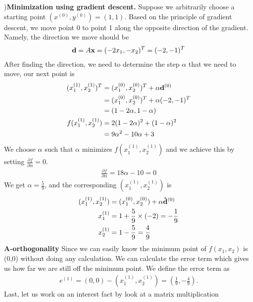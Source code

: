 \documentclass[a4paper]{article}
\begin{document}
){\bf Minimization using gradient descent.} Suppose we arbitrarily choose a starting point $(x^{(0)}, y^{(0)}) = (1, 1)$. Based on the principle of gradient descent, we move point 0 to point 1 along the opposite direction of the gradient. Namely, the direction we move should be
\begin{align*}
	{\bf d} =  A{\bf x} = (-2x_1, -x_2)^T = (-2, -1)^T
\end{align*}
After finding the direction, we need to determine the step $\alpha$ that we need to move, our next point is
\begin{align*}
	  (x_1^{(1)}, x_2^{(1)})^T & = (x_1^{(0)}, x_2^{(0)})^T + \alpha {\bf d}^{(0)} \\
                                              & = (x_1^{(0)} , x_2^{(0)})^T + \alpha(-2, -1)^T \\
	  					 & = (1 - 2\alpha, 1 -\alpha)\\
	f(x_1^{(1)}, x_2^{(1)}) & =  2(1 - 2\alpha)^2 + (1 -\alpha)^2\\
                                             & = 9\alpha ^2 -  10 \alpha + 3\\
\end{align*}
We choose $\alpha$ such that $\alpha$ minimizes $f(x_1^{(1)}, x_2^{(1)})$ and we achieve this by setting
$\frac{\partial f }{\partial \alpha} =0 $.
\begin{align*}
\frac{\partial f }{\partial \alpha} = 18\alpha-10 = 0
\end{align*}
 We get $\alpha = \frac{5}{9}$, and the corresponding $(x_1^{(1)}, x_2^{(1)} ) $ is\\
\begin{align*}
	 (x_1^{(1)}, x_2^{(1)}) & = (x_1^{(0)}, x_2^{(0)}) + \alpha {\bf \hat d}^{(0)} \\
	 x_1^{(1)} & = 1 + \frac{5}{9} \times (-2) = -\frac{1}{9} \\ 
	 x_2^{(1)} & = 1 - \frac{5}{9} = \frac{4}{9}\\
\end{align*}
{\bf A-orthogonality} Since we can easily know the minimum point of $f(x_1, x_2)$ is (0,0) without doing any calculation. We can calculate the error term which gives us how far we are still off the minimum point. We define the error term as
\begin{align*}
	e^{(1)} = (0, 0) - (x_1^{(1)}, x_2^{(1)}) = (\frac{1}{9}, -\frac{4}{9}).
\end{align*}
Last, let us work on an interest fact by look at a matrix multiplication
\end{document}
